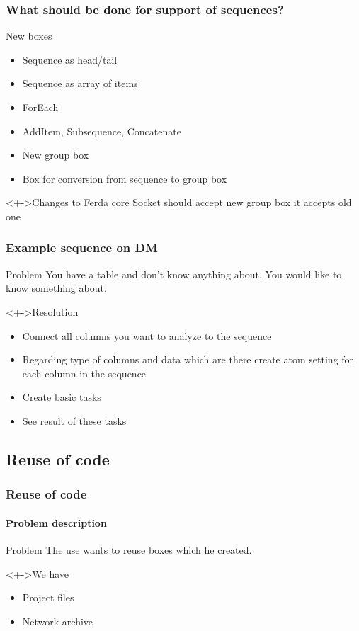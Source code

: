 \documentclass{beamer}
\begin{document}
\begin{frame}
	\frametitle{What should be done for support of sequences?}
	\begin{block}{New boxes}
		\begin{itemize}[<+->]
			\item Sequence as head/tail
			\item Sequence as array of items
			\item ForEach
			\item AddItem, Subsequence, Concatenate
			\item New group box
			\item Box for conversion from sequence to group box
		\end{itemize}	
	\end{block}
	\begin{block}<+->{Changes to Ferda core}
		\pause Socket should accept new group box it accepts old one
	\end{block}
\end{frame}

\begin{frame}
	\frametitle{Example sequence on DM}
	\begin{block}{Problem}
		You have a table and don't know anything about.
		You would like to know something about.
	\end{block}
	\begin{block}<+->{Resolution}
		\begin{itemize}[<+->]
			\item Connect all columns you want to analyze to the sequence
			\item Regarding type of columns and data which are there create atom setting for each column in the sequence
			\item Create basic tasks
			\item See result of these tasks
		\end{itemize}
	\end{block}
\end{frame}

\subsection{Reuse of code}
\begin{frame}
	\frametitle{Reuse of code}
	\framesubtitle{Problem description}
	\begin{block}{Problem}
		The use wants to reuse boxes which he created.
	\end{block}
	\begin{block}<+->{We have}
		\begin{itemize}[<+->]
			\item Project files
			\item Network archive
		\end{itemize}
	\end{block}
\end{frame}
\end{document}
